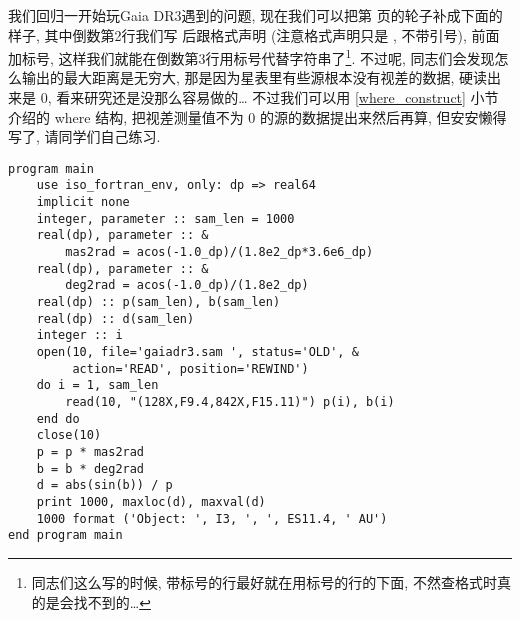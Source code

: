 我们回归一开始玩Gaia DR3遇到的问题, 现在我们可以把第 \pageref{gaiadr3.sam} 页的轮子补成下面的样子, 其中倒数第2行我们写  后跟格式声明 (注意格式声明只是 , 不带引号), 前面加标号, 这样我们就能在倒数第3行用标号代替字符串了\footnote{同志们这么写的时候, 带标号的行最好就在用标号的行的下面, 不然查格式时真的是会找不到的\dots{}}. 不过呢, 同志们会发现怎么输出的最大距离是无穷大, 那是因为星表里有些源根本没有视差的数据, 硬读出来是 $ 0 $, 看来研究还是没那么容易做的\dots{} 不过我们可以用 \ref{where_construct} 小节介绍的 where 结构, 把视差测量值不为 $0$ 的源的数据提出来然后再算, 但安安懒得写了, 请同学们自己练习.
\begin{lstlisting}
program main
    use iso_fortran_env, only: dp => real64
    implicit none
    integer, parameter :: sam_len = 1000
    real(dp), parameter :: &
        mas2rad = acos(-1.0_dp)/(1.8e2_dp*3.6e6_dp)
    real(dp), parameter :: &
        deg2rad = acos(-1.0_dp)/(1.8e2_dp)
    real(dp) :: p(sam_len), b(sam_len)
    real(dp) :: d(sam_len)
    integer :: i
    open(10, file='gaiadr3.sam ', status='OLD', &
         action='READ', position='REWIND')
    do i = 1, sam_len
        read(10, "(128X,F9.4,842X,F15.11)") p(i), b(i)
    end do
    close(10)
    p = p * mas2rad
    b = b * deg2rad
    d = abs(sin(b)) / p
    print 1000, maxloc(d), maxval(d)
    1000 format ('Object: ', I3, ', ', ES11.4, ' AU')
end program main
\end{lstlisting}

